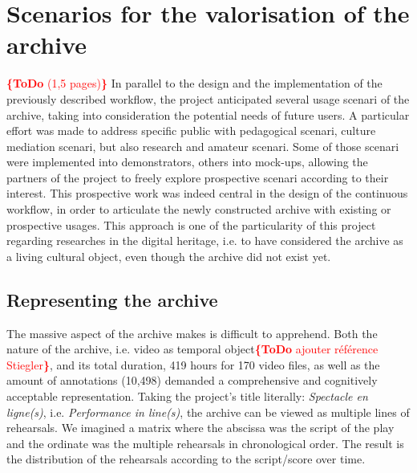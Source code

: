 \documentclass[conference]{IEEEtran}
\newcommand{\todo}[1]{\noindent\textcolor{red}{{\bf \{ToDo} #1{\bf \}}}}
\begin{document}
\section{Scenarios for the valorisation of the archive}
\todo{(1,5 pages)}
In parallel to the design and the implementation of the previously described workflow, the project anticipated several usage scenari of the archive, taking into consideration the potential needs of future users. A particular effort was made to address specific public with pedagogical scenari, culture mediation scenari, but also research and amateur scenari. Some of those scenari were implemented into demonstrators, others into mock-ups, allowing the partners of the project to freely explore prospective scenari according to their interest.
This prospective work was indeed central in the design of the continuous workflow, in order to articulate the newly constructed archive with existing or prospective usages. This approach is one of the particularity of this project regarding researches in the digital heritage, i.e. to have considered the archive as a living cultural object, even though the archive did not exist yet.

\subsection{Representing the archive}
The massive aspect of the archive makes is difficult to apprehend. Both the nature of the archive, i.e. video as temporal object\cite{stiegler90}\todo{ajouter référence Stiegler}, and its total duration, 419 hours for 170 video files, as well as the amount of annotations (10,498) demanded a comprehensive and cognitively acceptable representation. Taking the project's title literally: \emph{Spectacle en ligne(s)}, i.e. \emph{Performance in line(s)}, the archive can be viewed as multiple lines of rehearsals. We imagined a matrix where the abscissa was the script of the play and the ordinate was the multiple rehearsals in chronological order. The result is the distribution of the rehearsals according to the script/score over time.
\end{document}
